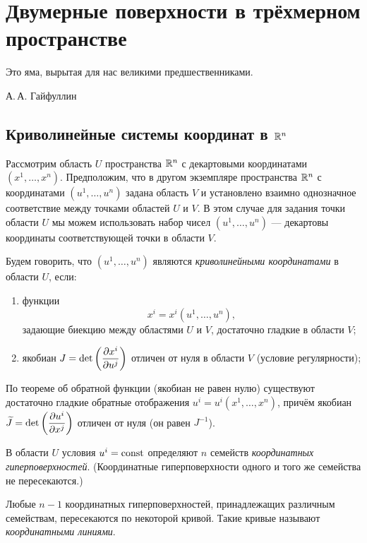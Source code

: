 \section{Двумерные поверхности в трёхмерном пространстве}

\epigraph{Это яма, вырытая для нас великими предшественниками.}{А.\,А. Гайфуллин}

\subsection{Криволинейные системы координат в $\mathbb{R}^n$}

Рассмотрим область $U$ пространства $\mathbb{R}^n$ с декартовыми координатами $(x^1, \ldots, x^n)$. Предположим, что в другом экземпляре пространства $\mathbb{R}^n$ с координатами $(u^1, \ldots, u^n)$ задана область $V$ и установлено взаимно однозначное соответствие между точками областей $U$ и $V$. В этом случае для задания точки области $U$ мы можем использовать набор чисел $(u^1, \ldots, u^n)$ --- декартовы координаты соответствующей точки в области $V$.

\begin{definition}
	Будем говорить, что $(u^1, \ldots, u^n)$ являются \textit{криволинейными координатами} в области $U$, если:
	\begin{enumerate}[nolistsep, label=(\arabic*)]
		\item функции
			\[
				x^i = x^i(u^1, \ldots, u^n),
			\]
			задающие биекцию между областями $U$ и $V$, достаточно гладкие в области $V$;
		\item якобиан $\displaystyle J = \det\left(\frac{\partial x^i}{\partial u^j}\right)$ отличен от нуля в области $V$ (условие регулярности);
	\end{enumerate}
\end{definition}

По теореме об обратной функции (якобиан не равен нулю) существуют достаточно гладкие обратные отображения $u^i = u^i(x^1, \ldots, x^n)$, причём якобиан $\displaystyle\widetilde{J} = \det\left(\frac{\partial u^i}{\partial x^j}\right)$ отличен от нуля (он равен $J^{-1}$).

В области $U$ условия $u^i = \mathrm{const}$ определяют $n$ семейств \textit{координатных гиперповерхностей}. (Координатные гиперповерхности одного и того же семейства не пересекаются.)

Любые $n - 1$ координатных гиперповерхностей, принадлежащих различным семействам, пересекаются по некоторой кривой. Такие кривые называют \textit{координатными линиями}.

